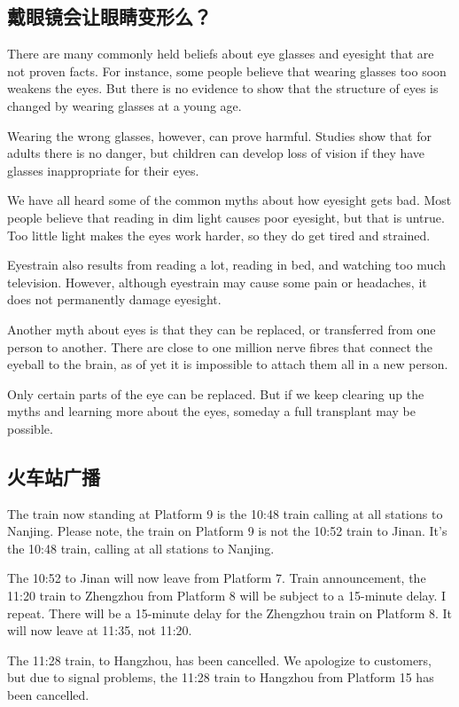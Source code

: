 \subsection{戴眼镜会让眼睛变形么？}
There are many commonly held beliefs about eye
glasses and eyesight that are not proven facts. For instance,
some people believe that wearing glasses too
soon weakens the eyes. But there is no evidence to show
that the structure of eyes is changed by wearing glasses at
a young age.

Wearing the wrong glasses, however, can prove harmful.
Studies show that for adults there is no danger, but
children can develop loss of vision if they have glasses inappropriate
for their eyes.

We have all heard some of the common myths about how
eyesight gets bad. Most people believe that reading in
dim light causes poor eyesight, but that is untrue. Too little
light makes the eyes work harder, so they do get tired and
strained.

Eyestrain also results from reading a lot, reading in bed,
and watching too much television. However, although
eyestrain may cause some pain or headaches, it does not
permanently damage eyesight.

Another myth about eyes is that they can be replaced, or
transferred from one person to another. There are close
to one million nerve fibres that connect the eyeball to the
brain, as of yet it is impossible to attach them all in a new
person.

Only certain parts of the eye can be replaced. But if
we keep clearing up the myths and learning more about
the eyes, someday a full transplant may be possible.
\subsection{火车站广播}
The train now standing at Platform 9 is the 10:48 train
calling at all stations to Nanjing. Please note, the train on
Platform 9 is not the 10:52 train to Jinan. It's the 10:48 train,
calling at all stations to Nanjing.

The 10:52 to Jinan will now leave from Platform 7. Train
announcement, the 11:20 train to Zhengzhou from Platform
8 will be subject to a 15-minute delay. I repeat. There
will be a 15-minute delay for the Zhengzhou train on Platform
8. It will now leave at 11:35, not 11:20.

The 11:28 train, to Hangzhou, has been cancelled. We
apologize to customers, but due to signal problems,
the 11:28 train to Hangzhou from Platform 15 has been
cancelled.


